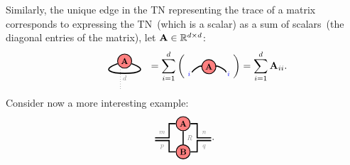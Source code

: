 Similarly, the unique edge in the TN representing the trace of a matrix corresponds to expressing the TN~(which is a scalar) as a sum of scalars~(the diagonal entries of the matrix), let $\mathbf{A}\in\mathbb{R}^{d\times d}$:
$$\begin{tikzpicture}[baseline=\baseline]
    \tikzset{tensor/.style = {minimum size = 0.5cm,shape = circle,thick,draw=black,inner sep = 0pt}, edge/.style = {thick,line width=.4mm},every loop/.style={}}
    \def\y{0}
    \def\x{0}
    \node[tensor,fill=red!50!white] (A) at (\x,\y+0.2){\scalebox{0.85}{$\Ab$}};
    \draw[edge] (A) to [out=-20,in=-160, distance=1.35cm] (A);
    \draw[dotted] (\x-0.15,\y-0.1) -- (\x-0.15,\y-0.8);
    \node[draw=none] () at (\x,\y-0.4) {\scalebox{0.7}{\dimcolor{$d$}}};
\end{tikzpicture}\hspace{-0.7cm}
=
\sum_{i=1}^d\left(
\begin{tikzpicture}[baseline=\baseline]
    \tikzset{tensor/.style = {minimum size = 0.5cm,shape = circle,thick,draw=black,inner sep = 0pt}, edge/.style = {thick,line width=.4mm},every loop/.style={}}
    \def\y{0}
    \def\x{0}
    \node[tensor,fill=red!50!white] (A) at (\x,\y){\scalebox{0.85}{$\Ab$}};
     \draw[edge] (\x-0.25,\y) to [out=110,in=60, distance=0.1cm] (\x-0.6,\y-0.2);    
    \draw[edge] (\x+0.25,\y) to [out=110,in=60, distance=0.1cm] (\x+0.6,\y-0.2); 
    \node[draw=none] () at (\x+0.7,\y-0.25) {\scalebox{0.7}{\indcolor{$i$}}};
    \node[draw=none] () at (\x-0.7,\y-0.25) {\scalebox{0.7}{\indcolor{$i$}}};
    \end{tikzpicture}\right)=\sum_{i=1}^d\Ab_{ii}.
    $$
Consider now a more interesting example:
$$\begin{tikzpicture}[baseline=\baseline]
    \tikzset{tensor/.style = {minimum size = 0.5cm,shape = circle,thick,draw=black,inner sep = 0pt}, edge/.style = {thick,line width=.4mm},every loop/.style={}}
    \def\y{0}
    \def\x{0}
    \node[tensor,fill=red!50!white] (A) at (\x,\y+0.5){\scalebox{0.85}{$\Ab$}};
    \node[tensor,fill=red!50!white] (B) at (\x,\y-0.5){\scalebox{0.85}{$\Bb$}};
    \draw[edge](A)--(B)node [midway, right] {\scalebox{0.7}{\dimcolor{$R$}}};
    \draw[edge](A) -- (\x+0.5,\y+0.5)--(\x+0.5,\y)--(\x+1,\y)node [midway, above] {\scalebox{0.7}{\dimcolor{$n$}}};
    \draw[edge](A) -- (\x-0.5,\y+0.5)--(\x-0.5,\y)--(\x-1,\y)node [midway, above] {\scalebox{0.7}{\dimcolor{$m$}}};
    \draw[edge](B) -- (\x+0.5,\y-0.5)--(\x+0.5,\y-0.1)--(\x+1,\y-0.1)node [midway, below] {\scalebox{0.7}{\dimcolor{$q$}}};
    \draw[edge](B) -- (\x-0.5,\y-0.5)--(\x-0.5,\y-0.1)--(\x-1,\y-0.1)node [midway, below] {\scalebox{0.7}{\dimcolor{$p$}}};
    \end{tikzpicture}.$$
